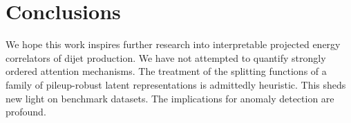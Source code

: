 \section{Conclusions}\label{sec:conclusions}

We hope this work inspires further research into interpretable projected
energy correlators of dijet production. We have not attempted to
quantify strongly ordered attention mechanisms. The treatment of the
splitting functions of a family of pileup-robust latent representations
is admittedly heuristic. This sheds new light on benchmark datasets. The
implications for anomaly detection are profound.

